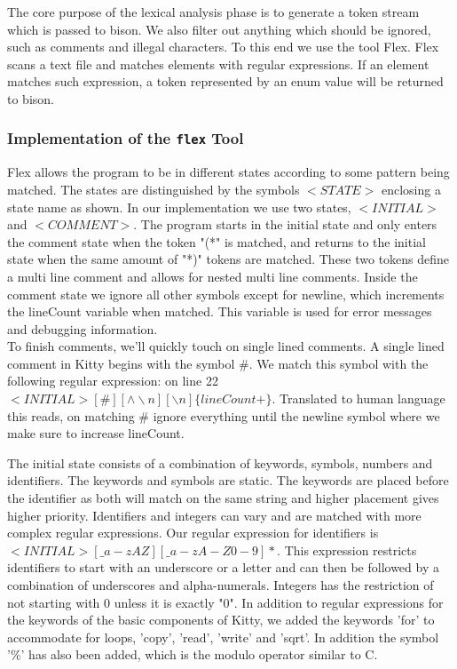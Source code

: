 \documentclass{article}
\begin{document}
The core purpose of the lexical analysis phase is to generate a token stream which is passed to bison. We also filter out anything which should be ignored, such as comments and illegal characters. To this end we use the tool Flex.\newline
Flex scans a text file and matches elements with regular expressions. If an element matches such expression, a token represented by an enum value will be returned to bison. \newline

\subsubsection{Implementation of the {\tt flex} Tool }
Flex allows the program to be in different states according to some pattern being matched.
The states are distinguished by the symbols $<STATE>$ enclosing a state name as shown.   
In our implementation we use two states, $<INITIAL>$ and $<COMMENT>$. The program starts in 
the initial state and only enters the comment state when the token "(*" is matched, and returns to the initial state when the same amount of "*)" tokens are matched. These two tokens define a multi line comment and allows for nested multi line comments. Inside the comment state we ignore all other symbols except for newline, which increments the lineCount variable when matched. This variable is used for error messages and debugging information.\\
To finish comments, we'll quickly touch on single lined comments. A single lined comment in Kitty begins with the symbol \#. We match this symbol with the following regular expression: 
on line 22 $<INITIAL>[\#][\wedge \backslash n][\backslash n]  \{lineCount +\}$. Translated to human language this reads, on matching \# ignore everything until the newline symbol where we make sure to increase lineCount. 

The initial state consists of a combination of keywords, symbols, numbers and identifiers. The keywords and symbols are static. The keywords are placed before the identifier as both will match on the same string and higher placement gives higher priority. 
Identifiers and integers can vary and are matched with more complex regular expressions. Our regular expression for identifiers is $<INITIAL>[\_a-zAZ][\_a-zA-Z0-9]*$. This expression restricts identifiers to start with an underscore or a letter and can then be followed by a combination of underscores and alpha-numerals. Integers has the restriction of not starting with 0 unless it is exactly "0".
\newline
\newline
In addition to regular expressions for the keywords of the basic components of Kitty, we added the keywords 'for' to accommodate for loops, 'copy', 'read', 'write' and 'sqrt'. In addition the symbol '\%' has also been added, which is the modulo operator similar to C.
\end{document}
